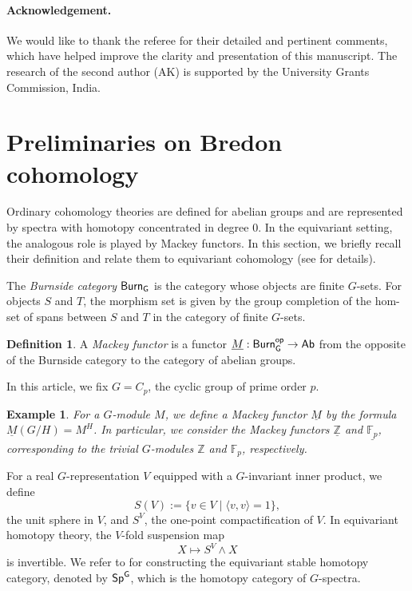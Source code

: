 \documentclass[a4paper,leqno,11pt]{amsart}
\newcommand{\uM}{\underline{M}}
\newcommand{\Z}{\mathbb Z}
\newcommand{\bF}{\mathbb{F}}
\newcommand{\bFp}{\bF_p}
\newcommand{\uFp}{\underline{\bFp}}
\newcommand{\uZ}{\underline{\mathbb{Z}}}
\newcommand{\Burn}{\sf{Burn}}
\newcommand{\Sp}{\sf{Sp}}
\theoremstyle{plain}
\newtheorem{example}[theorem]{Example}
\theoremstyle{definition}
\newtheorem{defn}[theorem]{Definition}
\theoremstyle{remark}
\begin{document}
\paragraph{\textbf{Acknowledgement.}} We would like to thank the referee for their detailed and pertinent comments, which have helped improve the clarity and presentation of this manuscript. The research of the second author (AK) is supported by the University Grants Commission, India.

\section{Preliminaries on Bredon cohomology}



Ordinary cohomology theories are defined for abelian groups and are represented by spectra with homotopy concentrated in degree 0. In the equivariant setting, the analogous role is played by Mackey functors. In this section, we briefly recall their definition and relate them to equivariant cohomology (see \cite{May96} for details).

The \emph{Burnside category} $\Burn_G$ is the category whose objects are finite $G$-sets. For objects $S$ and $T$, the morphism set is given by the group completion of the hom-set of spans between $S$ and $T$ in the category of finite $G$-sets.  

\begin{defn}
A \emph{Mackey functor} is a functor $\uM: \Burn_G^{op} \to \mathsf{Ab}$ from the opposite of the Burnside category to the category of abelian groups.
\end{defn}

In this article, we fix $G = C_p$, the cyclic group of prime order $p$. 

\begin{example}
    For a $G$-module $M$, we define a Mackey functor $\uM$ by the formula $\uM(G/H) = M^H$. In particular, we consider the Mackey functors $\uZ$ and $\uFp$, corresponding to the trivial $G$-modules $\Z$ and $\bFp$, respectively.
\end{example}

For a real $G$-representation $V$ equipped with a $G$-invariant inner product, we define 
\[
S(V) := \{ v \in V \mid \langle v, v \rangle = 1 \},
\]
the unit sphere in $V$, and $S^V$, the one-point compactification of $V$. In equivariant homotopy theory, the $V$-fold suspension map 
\[
X \mapsto S^V \wedge X
\]
is invertible. We refer to \cite{MM02} for constructing the equivariant stable homotopy category, denoted by $\Sp^G$, which is the homotopy category of $G$-spectra. 
\end{document}
